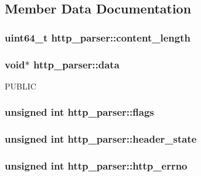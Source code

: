 \subsection{Member Data Documentation}
\hypertarget{structhttp__parser_a7fd5a194802b1206bb773e096d291f29}{
\subsubsection[{content\-\_\-length}]{\setlength{\rightskip}{0pt plus 5cm}uint64\-\_\-t http\-\_\-parser\-::content\-\_\-length}}\label{structhttp__parser_a7fd5a194802b1206bb773e096d291f29}
\hypertarget{structhttp__parser_a7e87ce57b97f60f1fdb7039a8ecb0bca}{
\subsubsection[{data}]{\setlength{\rightskip}{0pt plus 5cm}void$\ast$ http\-\_\-parser\-::data}}\label{structhttp__parser_a7e87ce57b97f60f1fdb7039a8ecb0bca}
P\-U\-B\-L\-I\-C \hypertarget{structhttp__parser_a5e54708e0cb3f9ced19bd829dcdeaf53}{
\subsubsection[{flags}]{\setlength{\rightskip}{0pt plus 5cm}unsigned int http\-\_\-parser\-::flags}}\label{structhttp__parser_a5e54708e0cb3f9ced19bd829dcdeaf53}
\hypertarget{structhttp__parser_ac5b254b99c6472ca19ae1f426758ce75}{
\subsubsection[{header\-\_\-state}]{\setlength{\rightskip}{0pt plus 5cm}unsigned int http\-\_\-parser\-::header\-\_\-state}}\label{structhttp__parser_ac5b254b99c6472ca19ae1f426758ce75}
\hypertarget{structhttp__parser_ab8638d65fa174bc1925d77e2533117fa}{
\subsubsection[{http\-\_\-errno}]{\setlength{\rightskip}{0pt plus 5cm}unsigned int http\-\_\-parser\-::http\-\_\-errno}}\label{structhttp__parser_ab8638d65fa174bc1925d77e2533117fa}
